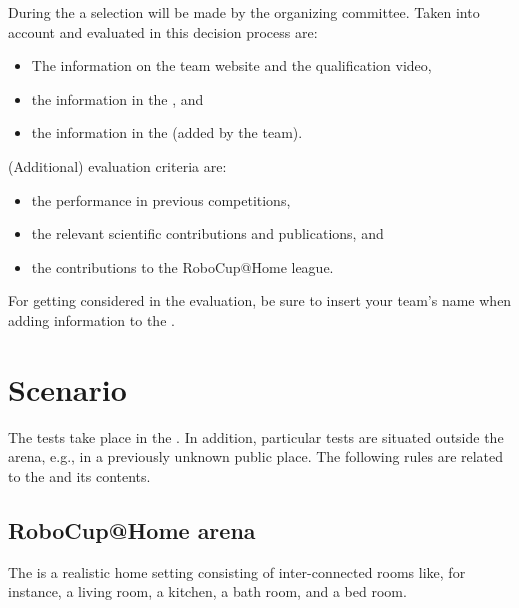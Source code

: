 During the  a selection will be made by the 
organizing committee.
Taken into account and evaluated in this decision process are:
\begin{itemize}
\item The information on the team website and the qualification video,
\item the information in the , and
\item the information in the  (added by the team).
\end{itemize}
(Additional) evaluation criteria are: 
\begin{itemize}
\item the performance in previous competitions, 
\item the relevant scientific contributions and publications, and
\item the contributions to the RoboCup@Home league.
\end{itemize}
For getting considered in the evaluation, be sure to insert your team's name 
when adding information to the .    




\section{Scenario}
\label{sec:scenario}

The tests take place in the .
In addition, particular tests are situated outside the arena, e.g., in a previously unknown public place.
The following rules are related to the  and its contents. 

\subsection{RoboCup@Home arena}
The  is a realistic home setting consisting of 
inter-connected rooms like, for instance, a living room, a kitchen, a bath 
room, and a bed room. 



